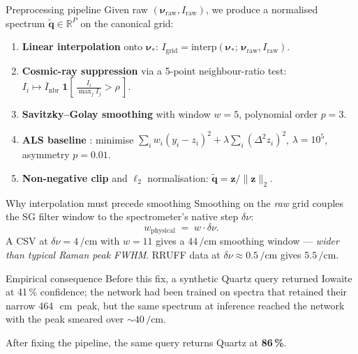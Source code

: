 \documentclass[10pt,aspectratio=169,xcolor=dvipsnames]{beamer}
\newcommand{\good}[1]{\textcolor{good}{\textbf{#1}}}
\newcommand{\cmone}{\si{\per\centi\meter}}
\begin{document}
\begin{frame}{Preprocessing pipeline}
  Given raw $(\boldsymbol\nu_{\text{raw}}, I_{\text{raw}})$, we produce a
  normalised spectrum $\tilde{\mathbf{q}} \in \mathbb{R}^{P}$ on the canonical grid:
  \medskip

  \begin{enumerate}\setlength\itemsep{0.25em}
    \item \textbf{Linear interpolation} onto $\boldsymbol\nu_{*}$:
          $I_{\text{grid}} = \mathrm{interp}\!\left(\boldsymbol\nu_{*};\,
          \boldsymbol\nu_{\text{raw}}, I_{\text{raw}}\right)$.
    \item \textbf{Cosmic-ray suppression} via a 5-point neighbour-ratio test:
          $I_i \mapsto \overline{I}_{\text{nbr}}\;\mathbf{1}\!\left[\,
          \tfrac{I_i}{\max_j I_j} > \rho\,\right]$.
    \item \textbf{Savitzky–Golay smoothing} with window $w = 5$, polynomial
          order $p = 3$.
    \item \textbf{ALS baseline} \cite{eilers2005baseline}: minimise
          $\sum_i w_i (y_i - z_i)^2 + \lambda \sum_i (\Delta^2 z_i)^2$,
          $\lambda = 10^5$, asymmetry $p = 0.01$.
    \item \textbf{Non-negative clip} and $\ell_2$ normalisation:
          $\tilde{\mathbf{q}} = \mathbf{z}/\lVert\mathbf{z}\rVert_2$.
  \end{enumerate}
\end{frame}

\begin{frame}{Why interpolation must precede smoothing}
  Smoothing on the \emph{raw} grid couples the SG filter window to the
  spectrometer's native step $\delta\nu$:
  \[
    w_{\text{physical}} \;=\; w \cdot \delta\nu .
  \]
  A CSV at $\delta\nu = 4\,\cmone$ with $w = 11$ gives a $44\,\cmone$
  smoothing window — \emph{wider than typical Raman peak FWHM}.
  RRUFF data at $\delta\nu \approx 0.5\,\cmone$ gives $5.5\,\cmone$.
  \bigskip

  \begin{alertblock}{Empirical consequence}
    Before this fix, a synthetic Quartz query returned
    \alert{Iowaite at 41\,\% confidence}; the network had been trained on
    spectra that retained their narrow 464\,\cmone\ peak, but the same
    spectrum at inference reached the network with the peak smeared
    over $\sim 40\,\cmone$.
  \end{alertblock}
  \medskip
  After fixing the pipeline, the same query returns Quartz at \good{86\,\%}.
\end{frame}
\end{document}
